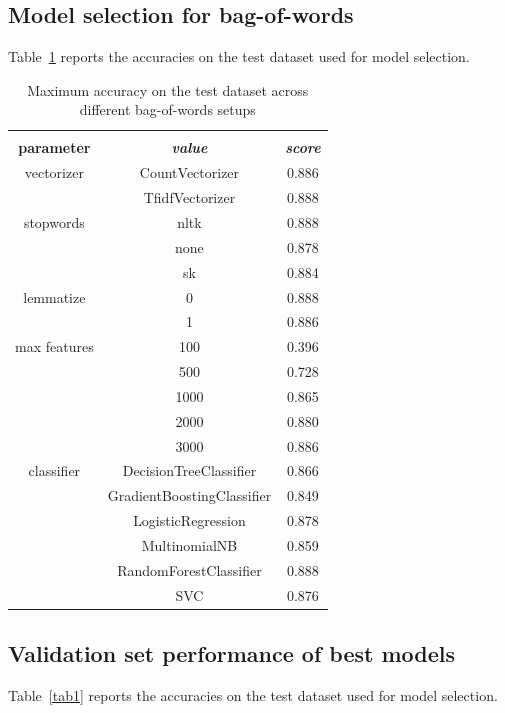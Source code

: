 \documentclass[conference]{IEEEtran}
\begin{document}
\subsection{Model selection for bag-of-words}
Table~\ref{tab5} reports the accuracies on the test dataset used for model selection.
\begin{table}[htbp]
\caption{Maximum accuracy on the test dataset across different bag-of-words setups}
\begin{center}
\begin{tabular}{|c|c|c|}
\hline
\textbf{}&\multicolumn{2}{|c|}{\textbf{}} \\ 
\cline{2-3}
\textbf{parameter} & \textbf{\textit{value}}& \textbf{\textit{score}} \\ 
\hline
vectorizer & CountVectorizer & 0.886 \\ 
\cline{2-3}
 & TfidfVectorizer & 0.888 \\ 
\hline
stopwords & nltk & 0.888 \\ 
\cline{2-3}
 & none & 0.878 \\ 
\cline{2-3}
 & sk & 0.884 \\ 
\hline
lemmatize & 0 & 0.888 \\ 
\cline{2-3}
 & 1 & 0.886 \\ 
\hline
max features  & 100 & 0.396 \\ 
\cline{2-3}
  & 500 & 0.728 \\ 
\cline{2-3}
 & 1000 & 0.865 \\ 
\cline{2-3}
  & 2000 & 0.880 \\ 
\cline{2-3}
  & 3000 & 0.886 \\ 
\hline
classifier & DecisionTreeClassifier & 0.866 \\ 
\cline{2-3}
 & GradientBoostingClassifier & 0.849 \\ 
\cline{2-3}
 & LogisticRegression & 0.878 \\ 
\cline{2-3}
 & MultinomialNB & 0.859 \\ 
\cline{2-3}
 & RandomForestClassifier & 0.888 \\ 
\cline{2-3}
 & SVC & 0.876 \\ 
\hline
\end{tabular}
\label{tab5}
\end{center}
\end{table}

\subsection{Validation set performance of best models}
Table~\ref{tab1} reports the accuracies on the test dataset used for model selection.
\end{document}
